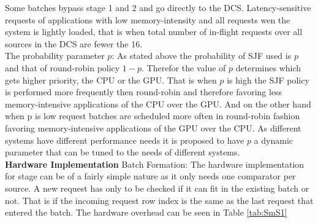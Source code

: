 \documentclass[12pt,journal,compsoc]{IEEEtran}
\begin{document}
Some batches bypass stage 1 and 2 and go directly to the DCS. Latency-sensitive requests of applications with low memory-intensity and all requests wen the system is lightly loaded, that is when total number of in-flight requests over all sources in the DCS are fewer the 16.\\

The probability parameter $p$:  As stated above the probability of SJF used is $p$ and that of round-robin policy $1-p$.  Therefor the value of $p$ determines  which gets higher priority, the CPU or the
GPU.  That is when $p$ is high the SJF policy is performed more frequently then round-robin and therefore favoring less memory-intensive applications of the CPU over the GPU.  And on the other hand when p is low request batches are scheduled more often in round-robin fashion favoring memory-intensive applications of the GPU over the CPU.  As different systems have different performance needs it is proposed to have $p$ a dynamic parameter that can be tuned to the needs of different systems.\\

\textbf{Hardware Implementation}
Batch Formation:  The hardware implementation for stage can be of a fairly simple nature as it only needs one comparator per source.  A new request has only to be checked if it can fit in the existing batch or not.  That is if the incoming request row index is the same as the last request that entered the batch.  The hardware overhead can be seen in Table \ref{tab:SmS1}

\begin{table}[H]
  \centering
  \caption{Storage Overhead of Stage 1: Batch formation stage \cite{SmS}}\label{tab:SmS1}
\end{table}
\end{document}
